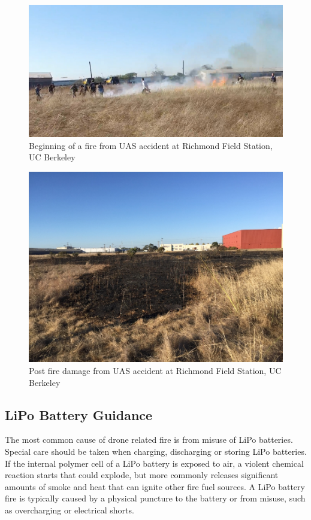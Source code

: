 \documentclass[
  12pt,
]{book}
\begin{document}
\begin{figure}

{\centering \includegraphics[width=0.75\linewidth]{images/fire_start} 

}

\caption{Beginning of a fire from UAS accident at Richmond Field Station, UC Berkeley}\label{fig:fire-start}
\end{figure}

\begin{figure}

{\centering \includegraphics[width=0.75\linewidth]{images/fire_damage} 

}

\caption{Post fire damage from UAS accident at Richmond Field Station, UC Berkeley}\label{fig:fire-damage}
\end{figure}

\subsection{LiPo Battery Guidance}\label{lipo-battery-guidance}

The most common cause of drone related fire is from misuse of LiPo batteries. Special care should be taken when charging, discharging or storing LiPo batteries. If the internal polymer cell of a LiPo battery is exposed to air, a violent chemical reaction starts that could explode, but more commonly releases significant amounts of smoke and heat that can ignite other fire fuel sources. A LiPo battery fire is typically caused by a physical puncture to the battery or from misuse, such as overcharging or electrical shorts.
\end{document}
